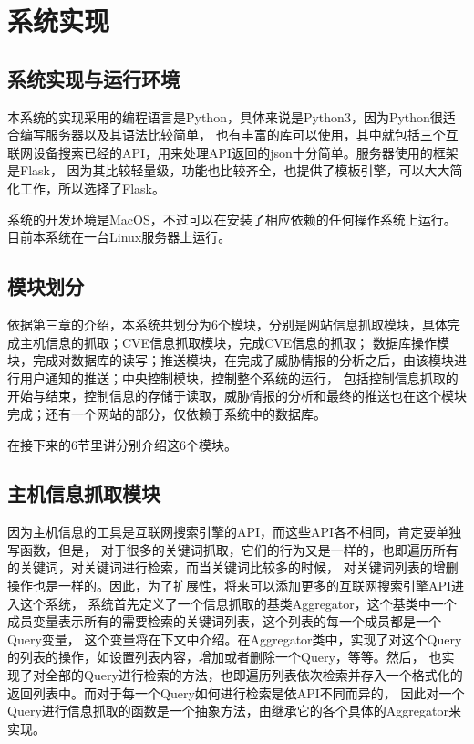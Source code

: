 \chapter{系统实现}
\label{cha:implementation}

\section{系统实现与运行环境}
\label{sec:env}

本系统的实现采用的编程语言是Python，具体来说是Python3，因为Python很适合编写服务器以及其语法比较简单，
也有丰富的库可以使用，其中就包括三个互联网设备搜索已经的API，用来处理API返回的json十分简单。服务器使用的框架是Flask，
因为其比较轻量级，功能也比较齐全，也提供了模板引擎，可以大大简化工作，所以选择了Flask。

系统的开发环境是MacOS，不过可以在安装了相应依赖的任何操作系统上运行。目前本系统在一台Linux服务器上运行。

\section{模块划分}
\label{sec:modules}

依据第三章的介绍，本系统共划分为6个模块，分别是网站信息抓取模块，具体完成主机信息的抓取；CVE信息抓取模块，完成CVE信息的抓取；
数据库操作模块，完成对数据库的读写；推送模块，在完成了威胁情报的分析之后，由该模块进行用户通知的推送；中央控制模块，控制整个系统的运行，
包括控制信息抓取的开始与结束，控制信息的存储于读取，威胁情报的分析和最终的推送也在这个模块完成；还有一个网站的部分，仅依赖于系统中的数据库。

在接下来的6节里讲分别介绍这6个模块。

\section{主机信息抓取模块}
\label{sec:hosts-module}

因为主机信息的工具是互联网搜索引擎的API，而这些API各不相同，肯定要单独写函数，但是，
对于很多的关键词抓取，它们的行为又是一样的，也即遍历所有的关键词，对关键词进行检索，而当关键词比较多的时候，
对关键词列表的增删操作也是一样的。因此，为了扩展性，将来可以添加更多的互联网搜索引擎API进入这个系统，
系统首先定义了一个信息抓取的基类Aggregator，这个基类中一个成员变量表示所有的需要检索的关键词列表，这个列表的每一个成员都是一个Query变量，
这个变量将在下文中介绍。在Aggregator类中，实现了对这个Query的列表的操作，如设置列表内容，增加或者删除一个Query，等等。然后，
也实现了对全部的Query进行检索的方法，也即遍历列表依次检索并存入一个格式化的返回列表中。而对于每一个Query如何进行检索是依API不同而异的，
因此对一个Query进行信息抓取的函数是一个抽象方法，由继承它的各个具体的Aggregator来实现。

